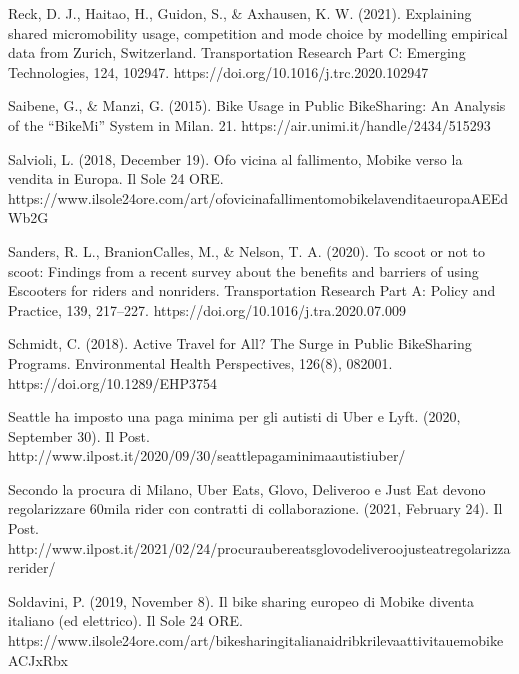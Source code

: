 \documentclass[letterpaper,10pt,english]{jupyterBook}
\begin{document}
\sphinxAtStartPar
Reck, D. J., Haitao, H., Guidon, S., \& Axhausen, K. W. (2021). Explaining shared micromobility usage, competition and mode choice by modelling empirical data from Zurich, Switzerland. Transportation Research Part C: Emerging Technologies, 124, 102947. https://doi.org/10.1016/j.trc.2020.102947

\sphinxAtStartPar
Saibene, G., \& Manzi, G. (2015). Bike Usage in Public Bike\sphinxhyphen{}Sharing: An Analysis of the “BikeMi” System in Milan. 21. https://air.unimi.it/handle/2434/515293

\sphinxAtStartPar
Salvioli, L. (2018, December 19). Ofo vicina al fallimento, Mobike verso la vendita in Europa. Il Sole 24 ORE. https://www.ilsole24ore.com/art/ofo\sphinxhyphen{}vicina\sphinxhyphen{}fallimento\sphinxhyphen{}mobike\sphinxhyphen{}la\sphinxhyphen{}vendita\sphinxhyphen{}europa\sphinxhyphen{}AEEdWb2G

\sphinxAtStartPar
Sanders, R. L., Branion\sphinxhyphen{}Calles, M., \& Nelson, T. A. (2020). To scoot or not to scoot: Findings from a recent survey about the benefits and barriers of using E\sphinxhyphen{}scooters for riders and non\sphinxhyphen{}riders. Transportation Research Part A: Policy and Practice, 139, 217–227. https://doi.org/10.1016/j.tra.2020.07.009

\sphinxAtStartPar
Schmidt, C. (2018). Active Travel for All? The Surge in Public Bike\sphinxhyphen{}Sharing Programs. Environmental Health Perspectives, 126(8), 082001. https://doi.org/10.1289/EHP3754

\sphinxAtStartPar
Seattle ha imposto una paga minima per gli autisti di Uber e Lyft. (2020, September 30). Il Post. http://www.ilpost.it/2020/09/30/seattle\sphinxhyphen{}paga\sphinxhyphen{}minima\sphinxhyphen{}autisti\sphinxhyphen{}uber/

\sphinxAtStartPar
Secondo la procura di Milano, Uber Eats, Glovo, Deliveroo e Just Eat devono regolarizzare 60mila rider con contratti di collaborazione. (2021, February 24). Il Post. http://www.ilpost.it/2021/02/24/procura\sphinxhyphen{}uber\sphinxhyphen{}eats\sphinxhyphen{}glovo\sphinxhyphen{}deliveroo\sphinxhyphen{}just\sphinxhyphen{}eat\sphinxhyphen{}regolarizzare\sphinxhyphen{}rider/

\sphinxAtStartPar
Soldavini, P. (2019, November 8). Il bike sharing europeo di Mobike diventa italiano (ed elettrico). Il Sole 24 ORE. https://www.ilsole24ore.com/art/bike\sphinxhyphen{}sharing\sphinxhyphen{}italiana\sphinxhyphen{}idri\sphinxhyphen{}bk\sphinxhyphen{}rileva\sphinxhyphen{}attivita\sphinxhyphen{}ue\sphinxhyphen{}mobike\sphinxhyphen{}ACJxRbx
\end{document}
